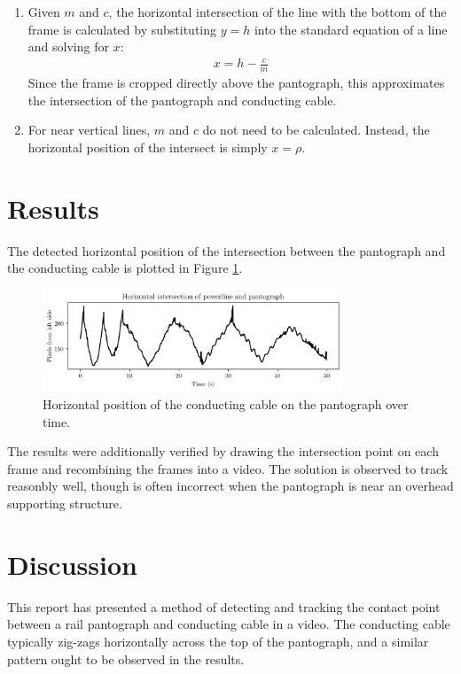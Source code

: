 \begin{enumerate}
  \item Given $m$ and $c$, the horizontal intersection of the line with the bottom of the frame is calculated by substituting $y=h$ into the standard equation of a line and solving for $x$:
  \begin{align}
    x = h - \frac{c}{m}
  \end{align}
  Since the frame is cropped directly above the pantograph, this approximates the intersection of the pantograph and conducting cable.

  \item For near vertical lines, $m$ and $c$ do not need to be calculated. Instead, the horizontal position of the intersect is simply $x=\rho$.

\end{enumerate}

\section{Results}

The detected horizontal position of the intersection between the pantograph and the conducting cable is plotted in Figure \ref{fig:results}.

\begin{figure}[ht]
  \centering
  \includegraphics[width=0.8\textwidth]{images/intersection_position.png}
  \caption{Horizontal position of the conducting cable on the pantograph over time.}
  \label{fig:results}
\end{figure}

The results were additionally verified by drawing the intersection point on each frame and recombining the frames into a video. The solution is observed to track reasonbly well, though is often incorrect when the pantograph is near an overhead supporting structure.

\newpage
\section{Discussion}

This report has presented a method of detecting and tracking the contact point between a rail pantograph and conducting cable in a video. The conducting cable typically zig-zags horizontally across the top of the pantograph, and a similar pattern ought to be observed in the results.

